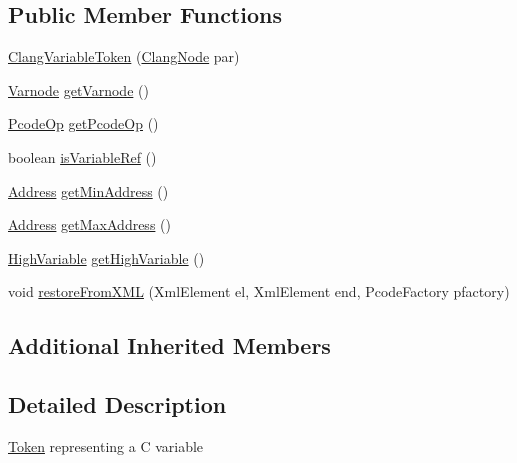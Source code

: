 \subsection*{Public Member Functions}
\begin{DoxyCompactItemize}
\item 
\mbox{\hyperlink{classghidra_1_1app_1_1decompiler_1_1_clang_variable_token_a606cf387dc3bb373fb390c4434c96f70}{Clang\+Variable\+Token}} (\mbox{\hyperlink{interfaceghidra_1_1app_1_1decompiler_1_1_clang_node}{Clang\+Node}} par)
\item 
\mbox{\hyperlink{class_varnode}{Varnode}} \mbox{\hyperlink{classghidra_1_1app_1_1decompiler_1_1_clang_variable_token_a1ca7e13dba091811591ea0b8058b1d71}{get\+Varnode}} ()
\item 
\mbox{\hyperlink{class_pcode_op}{Pcode\+Op}} \mbox{\hyperlink{classghidra_1_1app_1_1decompiler_1_1_clang_variable_token_a71fdcebf2fbb462277d93df4a6ab846c}{get\+Pcode\+Op}} ()
\item 
boolean \mbox{\hyperlink{classghidra_1_1app_1_1decompiler_1_1_clang_variable_token_a6ae3f8956567cd8cc5b18bf8e0238d70}{is\+Variable\+Ref}} ()
\item 
\mbox{\hyperlink{class_address}{Address}} \mbox{\hyperlink{classghidra_1_1app_1_1decompiler_1_1_clang_variable_token_a655defda8c1c17f607fdddb356e51b6b}{get\+Min\+Address}} ()
\item 
\mbox{\hyperlink{class_address}{Address}} \mbox{\hyperlink{classghidra_1_1app_1_1decompiler_1_1_clang_variable_token_a4a0d312a05e4e104f00e0433da2e1134}{get\+Max\+Address}} ()
\item 
\mbox{\hyperlink{class_high_variable}{High\+Variable}} \mbox{\hyperlink{classghidra_1_1app_1_1decompiler_1_1_clang_variable_token_a718ec8cced1a9f92ceb304d63c549613}{get\+High\+Variable}} ()
\item 
void \mbox{\hyperlink{classghidra_1_1app_1_1decompiler_1_1_clang_variable_token_ae368d27217523fd89248402ee45a61a6}{restore\+From\+X\+ML}} (Xml\+Element el, Xml\+Element end, Pcode\+Factory pfactory)
\end{DoxyCompactItemize}
\subsection*{Additional Inherited Members}


\subsection{Detailed Description}
\mbox{\hyperlink{class_token}{Token}} representing a C variable 

